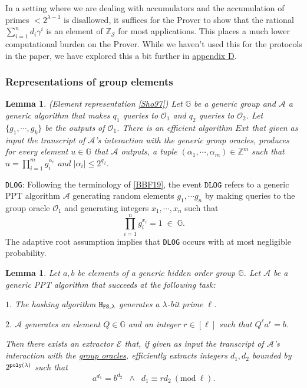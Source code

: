 \documentclass[11pt, lettersize, notitlepage, leqno, footskip=0.6cm]{article}
\newcommand{\bz}{\mathbb Z}
\newcommand{\pl}{\prod\limits}
\newcommand{\ttt}{\texttt}
\newcommand{\bG}{\mathbb{G}}
\newcommand{\mc}{\mathcal}
\newcommand{\mb}{\mathbb}
\newcommand{\al}{\alpha}
\newcommand{\lam}{\lambda}
\newcommand{\bzs}{\bz_{\mc{S}}}
\newcommand{\A}{\mc{A}}
\newcommand{\vs}{\vspace{-0.15cm}}
\newcommand{\noin}{\noindent}
\newcommand{\Mod}[1]{\ (\mathrm{mod}\ #1)}
\newcommand{\E}{\mc{E}}
\newtheorem{Lem}[Thm]{Lemma}
\numberwithin{equation}{section}
\begin{document}
In a setting where we are dealing with accumulators and the accumulation of primes $< 2^{\lam-1}$ is disallowed, it suffices for the Prover to show that the rational $\sum_{i=1}^n d_i{\gamma^i}$ is an element of $\bzs$ for most applications. This places a much lower computational burden on the Prover. While we haven't used this for the protocols in the paper, we have explored this a bit further in \hyperlink{shortcut}{appendix D}.


\subsubsection{\fontsize{11}{11}\selectfont Representations of group elements  }


\begin{Lem} {\normalfont (Element representation \hyperlink{Sho97}{[Sho97]})} Let $\bG$ be a generic group and $\A$ a generic algorithm that makes $q_1$ queries to $\mc{O}_1$ and $q_2$ queries to $\mc{O}_2$. Let $\{g_1,\cdots,g_k \}$ be the outputs of $\mc{O}_1$. There is an efficient algorithm $Ext$ that given as input the transcript of $\A$'s interaction with the generic group oracles, produces for every element $u\in \bG$ that $\A$ outputs, a tuple $(\al_1,\cdots,\al_m)\in \bz^m$ such that $u = \prod_{i=1}^m g_i^{\al_i}$ and $|\al_i| \leq 2^{q_2} $. \end{Lem} \vspace{0.1cm}


\noin \hypertarget{DLOG}{\ttt{DLOG}}: Following the terminology of \hyperlink{BBF19}{[BBF19]}, {the event $\ttt{DLOG}$} refers to a generic PPT algorithm $\mc{A}$ generating random elements $g_1,\cdots g_n$ by making queries to the group oracle $\mc{O}_1$ and generating integers $x_1,\cdots,x_n$ such that \vs $$\pl_{i=1}^n g_i^{x_i} = 1\;\in\;\bG .$$ The adaptive root assumption implies that \verb|DLOG| occurs with at most negligible probability.


\begin{Lem}\label{root} Let $a, b$ be elements of a generic hidden order group $\bG$. Let $\mc{A}$ be a generic PPT algorithm that succeeds at the following task:

\noin $1.$ The hashing algorithm ${\tt{H}}_{{\tt{FS}},\lam}$ generates a $\lam$-bit prime $\ell$.

\noin $2.$ $\mc{A}$ generates an element $Q\in \mb{G}$ and an integer $r\in [\ell]$ such that $Q^{\ell}a^r = b$.

\noin Then there exists an extractor \hspace{0.05cm}$\E$ that, if given as input the transcript of $\A$'s interaction with the \hyperlink{Oracles}{group oracles}, efficiently extracts integers $d_1,d_2$ bounded by $2^{\tt{poly}(\lam)}$ such that \vs $$a^{d_1} = b^{d_2}\;\;\wedge\;\;d_1\equiv rd_2\Mod{\ell}.  $$\end{Lem}
\end{document}
